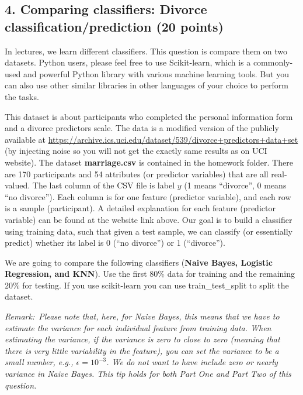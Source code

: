 \documentclass[12pt]{article}
\begin{document}
\subsection*{4. Comparing classifiers: Divorce classification/prediction (20 points)}

In lectures, we learn different classifiers. This question is compare them on two datasets. Python users, please feel free to use \textsf{Scikit-learn}, which is a commonly-used and powerful \textsf{Python} library with various machine learning tools. But you can also use other similar libraries in other languages of your choice to perform the tasks.


This dataset is about participants who completed the personal information form and a divorce predictors scale.  The data is a modified version of the publicly available at  \url{https://archive.ics.uci.edu/dataset/539/divorce+predictors+data+set} (by injecting noise so you will not get the exactly same results as on UCI website).  The dataset \textbf{marriage.csv} is contained in the homework folder. There are 170 participants and 54 attributes (or predictor variables) that are all real-valued. The last column of the CSV file is label $y$ (1 means ``divorce'', 0 means ``no divorce''). Each column is for one feature (predictor variable), and each row is a sample (participant). A detailed explanation for each feature (predictor variable) can be found at the website link above. Our goal is to build a classifier using training data, such that given a test sample, we can classify (or essentially predict) whether its label is 0 (``no divorce'') or 1 (``divorce''). 

We are going to compare the following classifiers  ({\bf Naive Bayes, Logistic Regression, and KNN}). Use the first $80\%$ data for training and the remaining $20\%$ for testing. If you use \textsf{scikit-learn} you can use \textsf{train\_test\_split} to split the dataset. 

\textit{Remark: Please note that, here, for Naive Bayes, this means that we have to estimate the variance for each individual feature from training data. When estimating the variance, if the variance is zero to close to zero (meaning that there is very little variability in the feature), you can set the variance to be a small number, e.g., $\epsilon = 10^{-3}$. We do not want to have include zero or nearly variance in Naive Bayes. This tip holds for both Part One and Part Two of this question.}
\end{document}
